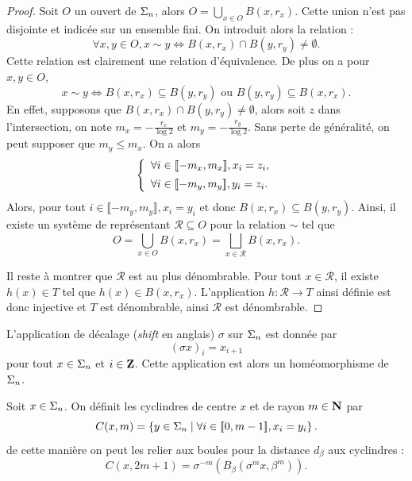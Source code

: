   \begin{proof}
    \leanok
    Soit $O$ un ouvert de $\Sigma_n$, alors $O = \bigcup_{x \in O}{B(x, r_x)}$.
    Cette union n'est pas disjointe et indicée sur un ensemble fini. On introduit alors la relation :
    $$\forall x,y \in O, x\sim y \iff B(x, r_x) \cap B(y, r_y) \not= \emptyset.$$
    Cette relation est clairement une relation d'équivalence. De plus on a pour $x, y \in O$,
    $$x \sim y \iff B(x, r_x) \subseteq B(y, r_y) \text{ ou } B(y, r_y) \subseteq B(x, r_x).$$
    En effet, supposons que $B(x, r_x) \cap B(y, r_y) \not= \emptyset$, alors soit $z$ dans l'intersection, on note $m_x = -\frac{r_x}{\log 2}$
    et $m_y = -\frac{r_y}{\log 2}$.
    Sans perte de généralité, on peut supposer que $m_y \leq m_x$. On a alors
    $$\left\{\begin{array}{l}
	\forall i \in \llbracket -m_x, m_x \rrbracket, x_i = z_i, \vspace{0.5em}\\
      \forall i \in \llbracket -m_y, m_y \rrbracket, y_i = z_i.
    \end{array}\right.$$
    Alors, pour tout $i \in \llbracket -m_y, m_y \rrbracket, x_i = y_i$ et donc $B(x, r_x) \subseteq B(y, r_y)$.
    Ainsi, il existe un système de représentant $\mathcal R \subseteq O$ pour la relation $\sim$ tel que
    $$O = \bigcup_{x\in O}{B(x, r_x)} = \bigsqcup_{x\in\mathcal R}{B(x, r_x)}.$$

    Il reste à montrer que $\mathcal R$ est au plus dénombrable.
    Pour tout $x \in \mathcal R$, il existe $h(x) \in T$ tel que $h(x) \in B(x, r_x)$.
    L'application $h \colon \mathcal R \longrightarrow T$ ainsi définie est donc injective et $T$ est dénombrable,
    ainsi $\mathcal R$ est dénombrable.
  \end{proof}

  \begin{definition}
    \label{def:shift}
    \leanok
    L'application de décalage (\textit{shift} en anglais) $\sigma$ sur $\Sigma_n$ est donnée par
    $$(\sigma x)_i = x_{i+1}$$
    pour tout $x \in \Sigma_n$ et $i \in \mathbf Z$.
    Cette application est alors un homéomorphisme de $\Sigma_n$.
  \end{definition}

  \begin{definition}
    \label{def:cylindres}
    \leanok
    Soit $x\in \Sigma_n$. On définit les cyclindres de centre $x$ et de rayon $m \in \mathbf N$ par
    $$C(x, m) = \left\{y \in \Sigma_n \mid \forall i \in [\![ 0, m - 1 ]\!], x_i = y_i\right\}.$$
    de cette manière on peut les relier aux boules pour la distance $d_{\beta}$ aux cyclindres :
    $$C(x,2m+1) = \sigma^{-m}(B_{\beta}(\sigma^mx, \beta^m)).$$
  \end{definition}
